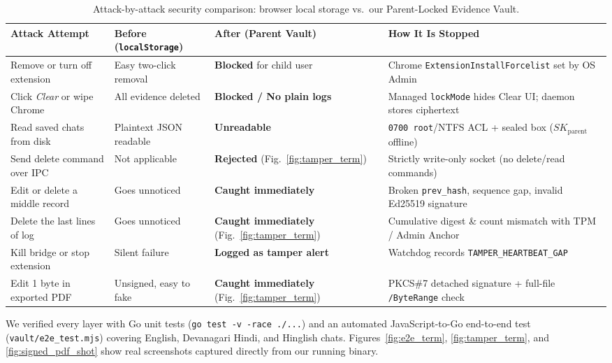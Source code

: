 \documentclass[11pt,a4paper]{article}
\begin{document}
\begin{table}[H]
\centering
\caption{Attack-by-attack security comparison: browser local storage vs.\ our Parent-Locked Evidence Vault.}
\label{tab:threat_matrix}
\footnotesize
\renewcommand{\arraystretch}{1.2}
\begin{tabularx}{\textwidth}{>{\raggedright\arraybackslash}p{3.4cm} >{\raggedright\arraybackslash}p{2.9cm} >{\raggedright\arraybackslash}p{3.1cm} >{\raggedright\arraybackslash}X}
\toprule
\textbf{Attack Attempt} & \textbf{Before (\texttt{localStorage})} & \textbf{After (Parent Vault)} & \textbf{How It Is Stopped} \\
\midrule
Remove or turn off extension & Easy two-click removal & \textbf{Blocked} for child user & Chrome \texttt{\scriptsize ExtensionInstallForcelist} set by OS Admin \\
Click \textit{Clear} or wipe Chrome & All evidence deleted & \textbf{Blocked / No plain logs} & Managed \texttt{lockMode} hides Clear UI; daemon stores ciphertext \\
Read saved chats from disk & Plaintext JSON readable & \textbf{Unreadable} & \texttt{0700 root}/NTFS ACL + sealed box ($SK_{\text{parent}}$ offline) \\
Send delete command over IPC & Not applicable & \textbf{Rejected} (Fig.~\ref{fig:tamper_term}) & Strictly write-only socket (no delete/read commands) \\
Edit or delete a middle record & Goes unnoticed & \textbf{Caught immediately} & Broken \texttt{prev\_hash}, sequence gap, invalid Ed25519 signature \\
Delete the last lines of log & Goes unnoticed & \textbf{Caught immediately} (Fig.~\ref{fig:tamper_term}) & Cumulative digest \& count mismatch with TPM / Admin Anchor \\
Kill bridge or stop extension & Silent failure & \textbf{Logged as tamper alert} & Watchdog records \texttt{\scriptsize TAMPER\_HEARTBEAT\_GAP} \\
Edit 1 byte in exported PDF & Unsigned, easy to fake & \textbf{Caught immediately} (Fig.~\ref{fig:tamper_term}) & PKCS\#7 detached signature + full-file \texttt{/ByteRange} check \\
\bottomrule
\end{tabularx}
\end{table}

We verified every layer with Go unit tests (\texttt{go test -v -race ./...}) and an automated JavaScript-to-Go end-to-end test (\texttt{vault/e2e\_test.mjs}) covering English, Devanagari Hindi, and Hinglish chats. Figures~\ref{fig:e2e_term}, \ref{fig:tamper_term}, and \ref{fig:signed_pdf_shot} show real screenshots captured directly from our running binary.
\end{document}
